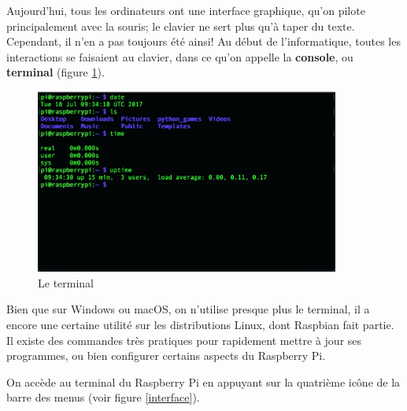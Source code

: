 Aujourd'hui, tous les ordinateurs ont une interface graphique, qu'on pilote principalement avec la souris; le clavier ne sert plus qu'à taper du texte. Cependant, il n'en a pas toujours été ainsi! Au début de l'informatique, toutes les interactions se faisaient au clavier, dans ce qu'on appelle la \textbf{console}, ou \textbf{terminal} (figure \ref{terminal}).

\begin{figure}[h!]
\begin{center}
\includegraphics[width=10cm]{ssh.png}
\end{center}
\caption{Le terminal}
\label{terminal}
\end{figure}

Bien que sur Windows ou macOS, on n'utilise presque plus le terminal, il a encore une certaine utilité sur les distributions Linux, dont Raspbian fait partie.
Il existe des commandes très pratiques pour rapidement mettre à jour ses programmes, ou bien configurer certains aspects du Raspberry Pi.

On accède au terminal du Raspberry Pi en appuyant sur la quatrième icône de la barre des menus (voir figure \ref{interface}).